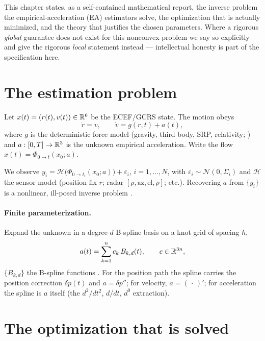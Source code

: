 This chapter states, as a self-contained mathematical report, the inverse
problem the empirical-acceleration (EA) estimators solve, the optimization
that is actually minimized, and the theory that justifies the chosen
parameters. Where a rigorous \emph{global} guarantee does not exist for
this nonconvex problem we say so explicitly and give the rigorous
\emph{local} statement instead --- intellectual honesty is part of the
specification here.

\section{The estimation problem}

\begin{definition}
Let $x(t)=(r(t),v(t))\in\mathbb{R}^{6}$ be the ECEF/GCRS state. The motion obeys
\begin{equation}
\dot r = v,\qquad \dot v = g(r,t) + a(t),
\label{eq:dyn}
\end{equation}
where $g$ is the deterministic force model (gravity, third body, SRP,
relativity; \cite{hairer1993}) and $a:[0,T]\to\mathbb{R}^{3}$ is the unknown
empirical acceleration. Write the flow $x(t)=\Phi_{0\to t}(x_0;a)$.
\end{definition}

We observe $y_i = \mathcal H\big(\Phi_{0\to t_i}(x_0;a)\big)+\varepsilon_i$,
$i=1,\dots,N$, with $\varepsilon_i\sim\mathcal N(0,\Sigma_i)$ and
$\mathcal H$ the sensor model (position fix $r$; radar
$[\rho,\mathrm{az},\mathrm{el},\dot\rho]$; etc.). Recovering $a$ from
$\{y_i\}$ is a nonlinear, ill-posed inverse problem
\cite{tikhonov1977,engl1996}.

\paragraph{Finite parameterization.} Expand the unknown in a degree-$d$
B-spline basis on a knot grid of spacing $h$,
\begin{equation}
a(t)=\sum_{k=1}^{n} c_k\,B_{k,d}(t),\qquad c\in\mathbb{R}^{3n},
\label{eq:spline}
\end{equation}
$\{B_{k,d}\}$ the B-spline functions \cite{deboor2001,schumaker2007}. For
the position path the spline carries the position correction $\delta p(t)$
and $a=\delta p''$; for velocity, $a=(\,\cdot\,)'$; for acceleration the
spline is $a$ itself (the $d^{2}/dt^{2}$, $d/dt$, $d^{0}$ extraction).

\section{The optimization that is solved}


